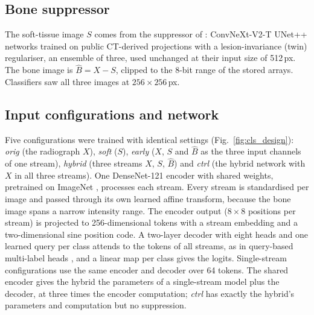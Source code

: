 \subsection{Bone suppressor}
The soft-tissue image $S$ comes from the suppressor of \companioncite: ConvNeXt-V2-T UNet++ networks
trained on public CT-derived projections with a lesion-invariance (twin) regulariser, an ensemble of three, used unchanged at their input
size of 512\,px. The bone image is $\hat B = X - S$, clipped to the 8-bit range of the stored arrays. Classifiers saw all three images at
$256\times256$\,px.

\subsection{Input configurations and network}
Five configurations were trained with identical settings (Fig.~\ref{fig:cls_design}):
\emph{orig} (the radiograph $X$), \emph{soft} ($S$), \emph{early} ($X$, $S$ and $\hat B$ as the three input channels of one stream),
\emph{hybrid} (three streams $X$, $S$, $\hat B$) and \emph{ctrl} (the hybrid network with $X$ in all three streams).
One DenseNet-121 encoder \citep{huang2017densenet} with shared weights, pretrained on ImageNet \citep{deng2009imagenet,wightman2019timm},
processes each stream. Every stream is standardised per image and passed through its own learned affine transform, because the bone image
spans a narrow intensity range. The encoder output ($8\times8$ positions per stream) is projected to 256-dimensional tokens with a
stream embedding and a two-dimensional sine position code. A two-layer decoder with eight heads and one learned query per class attends to
the tokens of all streams, as in query-based multi-label heads \citep{liu2021query2label,ridnik2023mldecoder}, and a linear map per class
gives the logits. Single-stream configurations use the same encoder and decoder over 64 tokens. The shared encoder gives the hybrid the
parameters of a single-stream model plus the decoder, at three times the encoder computation; \emph{ctrl} has exactly the hybrid's
parameters and computation but no suppression.

